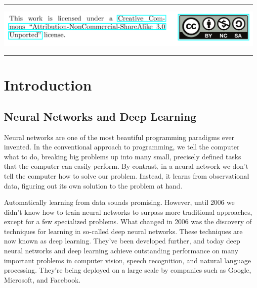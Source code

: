 \documentclass[a4paper,12pt]{report}%
\begin{document}
\vspace*{3cm}


\hrule

\includegraphics[width=\linewidth]{./images/ccl.png}

\hrule
\setcounter{page}{5}
\tableofcontents{}

\newpage

\setcounter{page}{9}


%
%
%
%

\chapter{\color{IAF} \bf Introduction}
\section{Neural Networks and Deep Learning}
Neural networks are one of the most beautiful programming paradigms ever invented. In the conventional approach to programming, we tell the computer what to do, breaking big problems up into many small, precisely defined tasks that the computer can easily perform. By contrast, in a neural network we don't tell the computer how to solve our problem. Instead, it learns from observational data, figuring out its own solution to the problem at hand.

Automatically learning from data sounds promising. However, until 2006 we didn't know how to train neural networks to surpass more traditional approaches, except for a few specialized problems. What changed in 2006 was the discovery of techniques for learning in so-called deep neural networks. These techniques are now known as deep learning. They've been developed further, and today deep neural networks and deep learning achieve outstanding performance on many important problems in computer vision, speech recognition, and natural language processing. They're being deployed on a large scale by companies such as Google, Microsoft, and Facebook.
\end{document}
